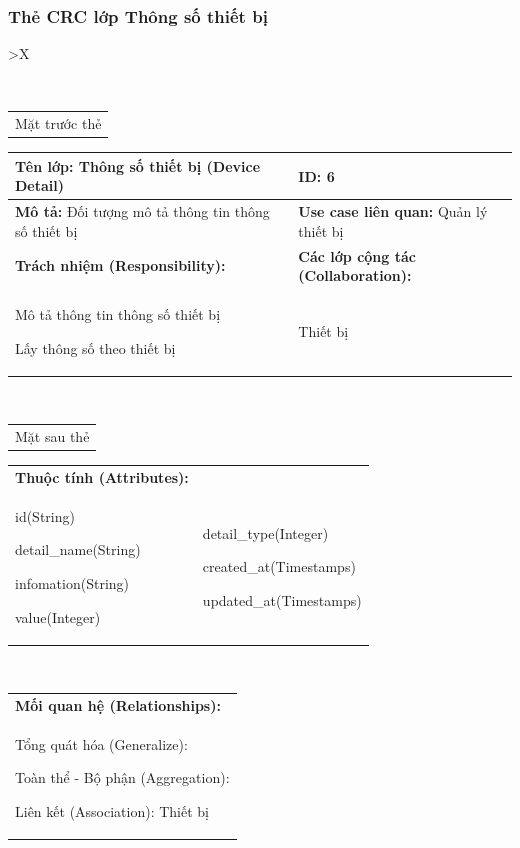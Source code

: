   \subsubsection{Thẻ CRC lớp Thông số thiết bị}
  \begin{xltabular}{\textwidth}{
    >{\centering\arraybackslash}X 
  }
  \caption{\bfseries \fontsize{12pt}{0pt}\selectfont Thẻ CRC lớp Thông số thiết bị}
  \\
  \begin{tabularx}{0.9\textwidth}{X}
    Mặt trước thẻ
  \end{tabularx}
  \begin{tabularx}{0.9\textwidth}{|X|X|}
    \hline
    \textbf{Tên lớp:} Thông số thiết bị (Device Detail) & \textbf{ID:} 6 \\
    \hline
    \textbf{Mô tả:} Đối tượng mô tả thông tin thông số thiết bị & \textbf{Use case liên quan:} Quản lý thiết bị\\
    \hline
    \textbf{Trách nhiệm (Responsibility):} & \textbf{Các lớp cộng tác (Collaboration):} \\
    Mô tả thông tin thông số thiết bị

    Lấy thông số theo thiết bị
    & 
    Thiết bị 
    \\
    \hline
  \end{tabularx}
  \\ 
  \begin{tabularx}{0.9\textwidth}{X}
    Mặt sau thẻ
  \end{tabularx} 
  \begin{tabularx}{0.9\textwidth}{|X|X|}
    \hline
    \textbf{Thuộc tính (Attributes):} & \\
    id(String) 
  
    detail\_name(String)

    infomation(String)
    
    value(Integer)
    & 
    detail\_type(Integer)
    
    created\_at(Timestamps)

    updated\_at(Timestamps)
    \\
    \hline
  \end{tabularx}
  \\     
  \begin{tabularx}{0.9\textwidth}{|X|}
    \textbf{Mối quan hệ (Relationships):} \\
    Tổng quát hóa (Generalize):  

    Toàn thể - Bộ phận (Aggregation): 
    
    Liên kết (Association): Thiết bị
    \\
    \hline
  \end{tabularx}
  \end{xltabular}

